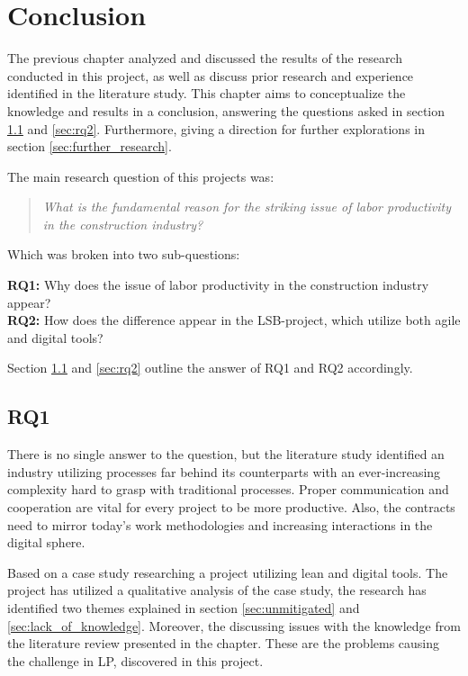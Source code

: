
\chapter{Conclusion} \label{cha:conclusion}
The previous chapter analyzed and discussed the results of the research conducted in this project, as well as discuss prior research and experience identified in the literature study. This chapter aims to conceptualize the knowledge and results in a conclusion, answering the questions asked in section \ref{sec:rq1} and \ref{sec:rq2}. Furthermore, giving a direction for further explorations in section \ref{sec:further_research}.

\noindent The main research question of this projects was: 
\begin{quote}
    \textit{What is the fundamental reason for the striking issue of labor productivity in the construction industry?} 
\end{quote}

\noindent Which was broken into two sub-questions:

{\noindent \bf RQ1:} Why does the issue of labor productivity in the construction industry appear? \\
{\bf RQ2:} How does the difference appear in the LSB-project, which utilize both agile and digital tools?

Section \ref{sec:rq1} and \ref{sec:rq2} outline the answer of RQ1 and RQ2 accordingly.

\section{RQ1} \label{sec:rq1}
There is no single answer to the question, but the literature study identified an industry utilizing processes far behind its counterparts with an ever-increasing complexity hard to grasp with traditional processes. Proper communication and cooperation are vital for every project to be more productive. Also, the contracts need to mirror today's work methodologies and increasing interactions in the digital sphere.
	 
Based on a case study researching a project utilizing lean and digital tools. The project has utilized a qualitative analysis of the case study, the research has identified two themes explained in section \ref{sec:unmitigated} and \ref{sec:lack_of_knowledge}. Moreover, the discussing issues with the knowledge from the literature review presented in the  chapter. These are the problems causing the challenge in LP, discovered in this project.
    
